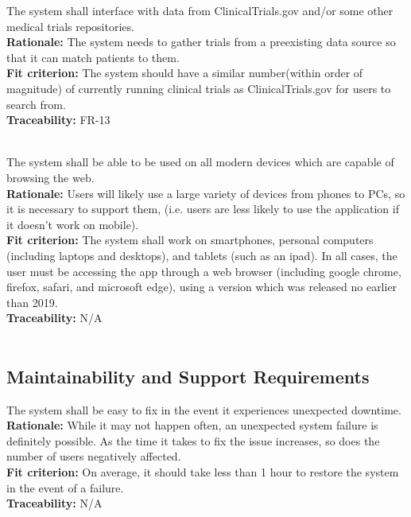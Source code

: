 \documentclass[12pt, titlepage]{article}
\newcounter{NFR_Counter}
\newcounter{FR_Counter}
\begin{document}
The system shall interface with data from ClinicalTrials.gov and/or some other medical trials repositories.\\
\textbf{Rationale:}
The system needs to gather trials from a preexisting data source so that it can match patients to them.\\
\textbf{Fit criterion:}
The system should have a similar number(within order of magnitude) of currently running clinical trials as ClinicalTrials.gov for users to search from.\\
\textbf{Traceability:}
FR-13 \\~\\
\addtocounter{NFR_Counter}{1}

The system shall be able to be used on all modern devices which are capable of browsing the web.\\
\textbf{Rationale:}
Users will likely use a large variety of devices from phones to PCs, so it is necessary to support them, (i.e. users are less likely to use the application if it doesn't work on mobile).\\
\textbf{Fit criterion:}
The system shall work on smartphones, personal computers (including laptops and desktops), and tablets (such as an ipad). In all cases, the user must be accessing the app through a web browser (including google chrome, firefox, safari, and microsoft edge), using a version which was released no earlier than 2019.\\
\textbf{Traceability:}
N/A \\~\\
\addtocounter{NFR_Counter}{1}

\subsection{Maintainability and Support Requirements}


The system shall be easy to fix in the event it experiences unexpected downtime.\\
\textbf{Rationale:}
While it may not happen often, an unexpected system failure is definitely possible. As the time it takes 
to fix the issue increases, so does the number of users negatively affected.\\
\textbf{Fit criterion:}
On average, it should take less than 1 hour to restore the system in the event of a failure.\\
\textbf{Traceability:}
N/A \\~\\
\addtocounter{NFR_Counter}{1}
\end{document}

